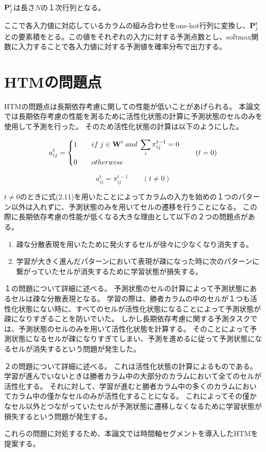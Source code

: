 ${\bf P}^t_j$は長さ$N$の１次行列となる。

ここで各入力値に対応しているカラムの組み合わせをone-hot行列に変換し、${\bf P}^t_j$との要素積をとる。この値をそれぞれの入力に対する予測点数とし、softmax関数に入力することで各入力値に対する予測値を確率分布で出力する。

\section{HTMの問題点}
HTMの問題点は長期依存考慮に関しての性能が低いことがあげられる。
本論文では長期依存考慮の性能を測るために活性化状態の計算に予測状態のセルのみを使用して予測を行った。
そのため活性化状態の計算は以下のようにした。

\begin{equation}
  a^t_{ij} =
  \left\{
  \begin{alignedat}{2}
      1 \qquad &if \; j\in{\bf W}^t \; and \; \sum_i \pi^{t-1}_{ij} = 0\\
      0 \qquad &otherwise\\
  \end{alignedat}
  \right. \qquad (t = 0)\\
\end{equation}

\begin{equation}
  a^t_{ij} = \pi^{t-1}_{ij} \qquad (t \neq 0)
\end{equation}

$t \neq 0$のときに式(2.11)を用いたことによってカラムの入力を始めの１つのパターン以外は入れずに、予測状態のみを用いてセルの遷移を行うことになる。
この際に長期依存考慮の性能が低くなる大きな理由として以下の２つの問題点がある。

\begin{enumerate}
  \item 疎な分散表現を用いたために発火するセルが徐々に少なくなり消失する。
  \item 学習が大きく進んだパターンにおいて表現が疎になった時に次のパターンに繋がっていたセルが消失するために学習状態が損失する。
\end{enumerate}

１の問題について詳細に述べる。
予測状態のセルの計算によって予測状態にあるセルは疎な分散表現となる。
学習の際は、勝者カラムの中のセルが１つも活性化状態にない時に、すべてのセルが活性化状態になることによって予測状態が疎になりすぎることを防いでいた。
しかし長期依存考慮に関する予測タスクでは、予測状態のセルのみを用いて活性化状態を計算する。
そのことによって予測状態になるセルが疎になりすぎてしまい、予測を進めるに従って予測状態になるセルが消失するという問題が発生した。

２の問題について詳細に述べる。
これは活性化状態の計算によるものである。
学習が進んでいないときは勝者カラム中の大部分のカラムにおいて全てのセルが活性化する。
それに対して、学習が進むと勝者カラム中の多くのカラムにおいてカラム中の僅かなセルのみが活性化することになる。
これによってその僅かなセル以外とつながっていたセルが予測状態に遷移しなくなるために学習状態が損失するという問題が発生する。

これらの問題に対処するため、本論文では時間軸セグメントを導入したHTMを提案する。
